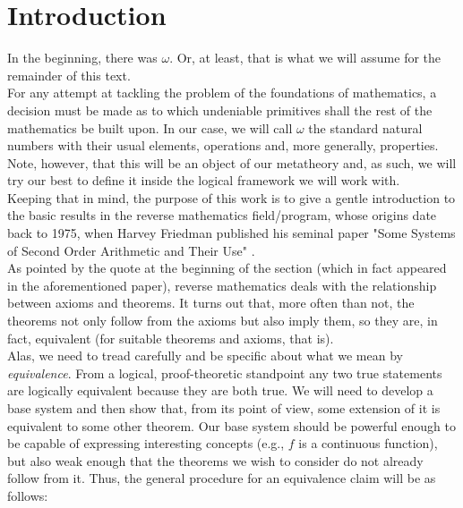 \documentclass[../main.tex]{book}
\begin{document}
\chapter{Introduction}


In the beginning, there was $\omega$. Or, at least, that is what we will assume for the remainder of this text. \\

For any attempt at tackling the problem of the foundations of mathematics, a decision must be made as to which undeniable primitives shall the rest of the mathematics be built upon. In our case, we will call $\omega$ the standard natural numbers with their usual elements, operations and, more generally, properties. Note, however, that this will be an object of our metatheory and, as such, we will try our best to define it inside the logical framework we will work with. \\

Keeping that in mind, the purpose of this work is to give a gentle introduction to the basic results in the reverse mathematics field/program, whose origins date back to 1975, when Harvey Friedman published his seminal paper "Some Systems of Second Order Arithmetic and Their Use" \cite{friedman}. \\

As pointed by the quote at the beginning of the section (which in fact appeared in the aforementioned paper), reverse mathematics deals with the relationship between axioms and theorems. It turns out that, more often than not, the theorems not only follow from the axioms but also imply them, so they are, in fact, equivalent (for suitable theorems and axioms, that is). \\

Alas, we need to tread carefully and be specific about what we mean by \textit{equivalence}. From a logical, proof-theoretic standpoint any two true statements are logically equivalent because they are both true. We will need to develop a base system and then show that, from its point of view, some extension of it is equivalent to some other theorem. Our base system should be powerful enough to be capable of expressing interesting concepts (e.g., $f$ is a continuous function), but also weak enough that the theorems we wish to consider do not already follow from it. Thus, the general procedure for an equivalence claim will be as follows: \\
\end{document}
